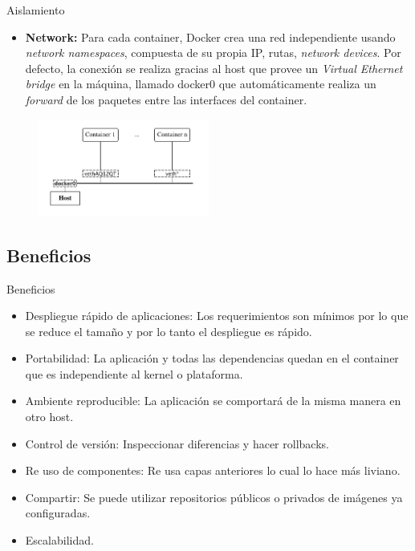 \documentclass[compress]{beamer}
\begin{document}
\begin{frame}{Aislamiento}
	\begin{itemize}
	
		\item \textbf{Network:}
		Para cada container, Docker crea una red independiente usando \textit{network namespaces}, compuesta de su propia IP, rutas, \textit{network devices}.
		Por defecto, la conexión se realiza gracias al host que provee un \textit{Virtual Ethernet bridge} en la máquina, llamado docker0 que automáticamente realiza un \textit{forward} de los paquetes entre las interfaces del container.
	\end{itemize}
	
	\begin{figure}[H]
  \centering
  \includegraphics[width=0.5\textwidth]{images/network.png}
    \label{fig:dynamic}
\end{figure}	
\end{frame}

\subsection{Beneficios}

\begin{frame}{Beneficios}
	\begin{itemize}
		\item Despliegue rápido de aplicaciones: Los requerimientos son mínimos por lo que se reduce el tamaño y por lo tanto el despliegue es rápido.
		\item Portabilidad: La aplicación y todas las dependencias quedan en el container que es independiente al kernel o plataforma.
		\item Ambiente reproducible: La aplicación se comportará de la misma manera en otro host.
		\item Control de versión: Inspeccionar diferencias y hacer rollbacks.
		\item Re uso de componentes: Re usa capas anteriores lo cual lo hace más liviano.
		\item Compartir: Se puede utilizar repositorios públicos o privados de imágenes ya configuradas.
		\item Escalabilidad.
	\end{itemize}
\end{frame}
\end{document}
